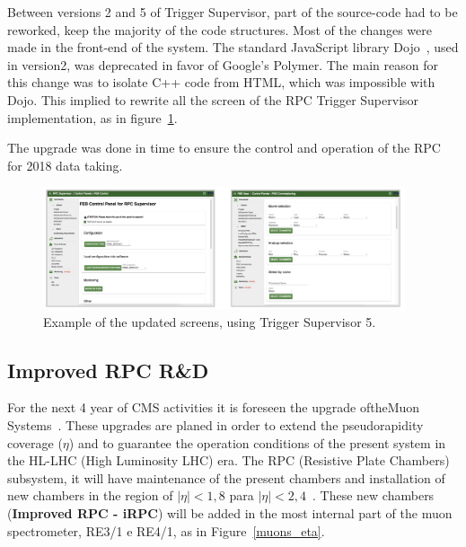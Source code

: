 Between versions 2 and 5 of Trigger Supervisor, part of the source-code had to be reworked, keep the majority of the code structures. Most of the changes were made in the front-end of the system. The standard JavaScript library Dojo~\cite{dojo}, used in version2, was deprecated in favor of Google's Polymer\cite{polymer}. The main reason for this change was to isolate C++ code from HTML, which was impossible with Dojo. This implied to rewrite all the screen of the RPC Trigger Supervisor implementation, as in figure~\ref{ts_view}.

The upgrade  was done in time to ensure the control and operation of the RPC for 2018 data taking.

\begin{figure}[h]
\begin{center}
\includegraphics[width=0.95\textwidth,keepaspectratio]{figures_and_tables/rpc/ts_view.png}
\end{center}
\caption{Example of the updated screens, using Trigger Supervisor 5.}\label{ts_view}
\end{figure}


\subsection{Improved RPC R\&D}

For the next 4 year of CMS activities it is foreseen  the upgrade oftheMuon Systems~\cite{muon_tdr}. These upgrades are planed in order to extend the pseudorapidity coverage ($\eta$) and to guarantee the operation conditions of the present system in the HL-LHC (High Luminosity LHC) era. The RPC (Resistive Plate Chambers)~\cite{muon_tdr} subsystem, it will have maintenance of the present chambers and installation of new chambers in the region of $|\eta| < 1,8$ para $|\eta| < 2,4$~\cite{pedrazamorales2018rpc}. These new chambers (\textbf{Improved RPC - iRPC}) will be added in the most internal part of the muon spectrometer, RE3/1 e RE4/1, as in Figure~\ref{muons_eta}.

